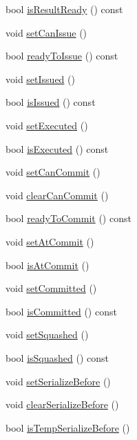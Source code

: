 \begin{DoxyCompactItemize}
\item 
bool \hyperlink{classInOrderDynInst_aa494f3355348eb3a97ce809b6361e195}{isResultReady} () const 
\item 
void \hyperlink{classInOrderDynInst_a2531049d5481976af68c8586015f0047}{setCanIssue} ()
\item 
bool \hyperlink{classInOrderDynInst_a29fcc55658982386428d8035e438589f}{readyToIssue} () const 
\item 
void \hyperlink{classInOrderDynInst_a04eb3fc23b5c2e74dc6d12afc25f0198}{setIssued} ()
\item 
bool \hyperlink{classInOrderDynInst_a1b4092ba688a1efd54c934a31dd1fd3e}{isIssued} () const 
\item 
void \hyperlink{classInOrderDynInst_a22145fd061c0a41a9b7d3c8b499269a9}{setExecuted} ()
\item 
bool \hyperlink{classInOrderDynInst_a25d5f6d24c54820fbd19eb0e4e59dcac}{isExecuted} () const 
\item 
void \hyperlink{classInOrderDynInst_a0cbc886f9978503b587b4d7a7e3db728}{setCanCommit} ()
\item 
void \hyperlink{classInOrderDynInst_ad22bc2d91297685b76dc15215666883d}{clearCanCommit} ()
\item 
bool \hyperlink{classInOrderDynInst_a0bfca6b2400cf8496f4e685668839861}{readyToCommit} () const 
\item 
void \hyperlink{classInOrderDynInst_adef575a8b55171e005db4954a44e5caf}{setAtCommit} ()
\item 
bool \hyperlink{classInOrderDynInst_a8b514343a000efa2bf568c4f964cb8b1}{isAtCommit} ()
\item 
void \hyperlink{classInOrderDynInst_a101a00eca65e94adc1377989d88a3c99}{setCommitted} ()
\item 
bool \hyperlink{classInOrderDynInst_a9cc760f9838c39bfb3112cdbfb468cf3}{isCommitted} () const 
\item 
void \hyperlink{classInOrderDynInst_abfa7b30b342b5ef70b7e060b305a2f94}{setSquashed} ()
\item 
bool \hyperlink{classInOrderDynInst_add8df091bd836cf92c6987990d130b83}{isSquashed} () const 
\item 
void \hyperlink{classInOrderDynInst_a820fdb5f79e789fc8efffb15f1995695}{setSerializeBefore} ()
\item 
void \hyperlink{classInOrderDynInst_a09b692cf6e7b00c1160248452fa24d4b}{clearSerializeBefore} ()
\item 
bool \hyperlink{classInOrderDynInst_a4df2bcaf5414d6db99fb8a5b0aba708a}{isTempSerializeBefore} ()

\end{DoxyCompactItemize}
